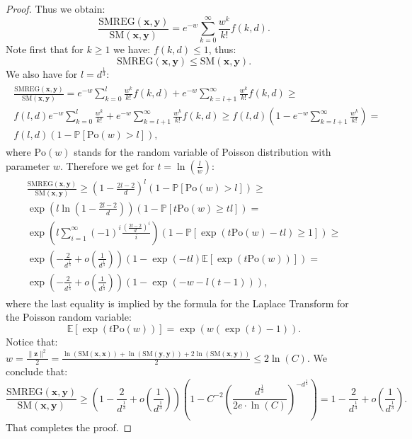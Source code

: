 \begin{proof}
Thus we obtain:
\begin{equation}
\frac{\mathrm{SMREG}(\mathbf{x}, \mathbf{y})}{\mathrm{SM}(\mathbf{x}, \mathbf{y})} = 
e^{-w}\sum_{k=0}^{\infty} \frac{w^{k}}{k!}f(k, d).
\end{equation}
Note first that for $k \geq 1$ we have: $f(k, d) \leq 1$, thus:
\begin{equation}
\mathrm{SMREG}(\mathbf{x}, \mathbf{y}) \leq \mathrm{SM}(\mathbf{x}, \mathbf{y}).    
\end{equation}
We also have for $l=d^{\frac{1}{3}}$:
\begin{align}
\begin{split}
\frac{\mathrm{SMREG}(\mathbf{x}, \mathbf{y})}{\mathrm{SM}(\mathbf{x}, \mathbf{y})} = 
e^{-w}\sum_{k=0}^{l} \frac{w^{k}}{k!}f(k, d) +  
e^{-w}\sum_{k=l+1}^{\infty} \frac{w^{k}}{k!}f(k, d) \geq \\
f(l, d) e^{-w}\sum_{k=0}^{l} \frac{w^{k}}{k!} +
e^{-w}\sum_{k=l+1}^{\infty} \frac{w^{k}}{k!}f(k, d) \geq
f(l, d)(1 - e^{-w}\sum_{k=l+1}^{\infty} \frac{w^{k}}{k!}) = \\
f(l, d)(1-\mathbb{P}[\mathrm{Po}(w) > l]),
\end{split}
\end{align}
where $\mathrm{Po}(w)$ stands for the random variable of Poisson distribution with parameter $w$.
Therefore we get for $t = \ln(\frac{l}{w})$:
\begin{align}
\begin{split}
\frac{\mathrm{SMREG}(\mathbf{x}, \mathbf{y})}{\mathrm{SM}(\mathbf{x}, \mathbf{y})} \geq 
(1-\frac{2l-2}{d})^{l}(1-\mathbb{P}[\mathrm{Po}(w) > l]) \geq \\
\exp(l \ln(1-\frac{2l-2}{d}))(1-\mathbb{P}[t\mathrm{Po}(w) \geq tl]) = \\
\exp\left(l \sum_{i=1}^{\infty}(-1)^{i}\frac{(\frac{2l-2}{d})^{i}}{i}\right)(1-\mathbb{P}[\exp(t\mathrm{Po}(w)-tl) \geq 1]) \geq \\
\exp(-\frac{2}{d^{\frac{1}{3}}}+o(\frac{1}{d^{\frac{1}{3}}}))
(1-\exp(-tl)\mathbb{E}[\exp(t\mathrm{Po}(w))])
= \\
\exp(-\frac{2}{d^{\frac{1}{3}}}+o(\frac{1}{d^{\frac{1}{3}}}))
(1-\exp(-w-l(t-1))),
\end{split} 
\end{align}
where the last equality is implied by the formula for the Laplace Transform for the Poisson random variable:
\begin{equation}
\mathbb{E}[\exp(t\mathrm{Po}(w))] = \exp(w(\exp(t)-1)).    
\end{equation}
Notice that: 
$w = \frac{\|\mathbf{z}\|^{2}}{2} = \frac{\ln(\mathrm{SM}(\mathbf{x},\mathbf{x}))+\ln(\mathrm{SM}(\mathbf{y},\mathbf{y})) + 2\ln(\mathrm{SM}(\mathbf{x}, \mathbf{y}))}{2} \leq 2\ln(C)$.
We conclude that:
\begin{equation}
\frac{\mathrm{SMREG}(\mathbf{x}, \mathbf{y})}{\mathrm{SM}(\mathbf{x}, \mathbf{y})} \geq  
(1-\frac{2}{d^{\frac{1}{3}}}+o(\frac{1}{d^{\frac{1}{3}}}))(1-C^{-2}(\frac{d^{\frac{1}{3}}}{2e \cdot \ln(C)})^{-d^{\frac{1}{3}}})
=1 - \frac{2}{d^{\frac{1}{3}}} + o(\frac{1}{d^{\frac{1}{3}}}).
\end{equation}
That completes the proof.
\end{proof}

